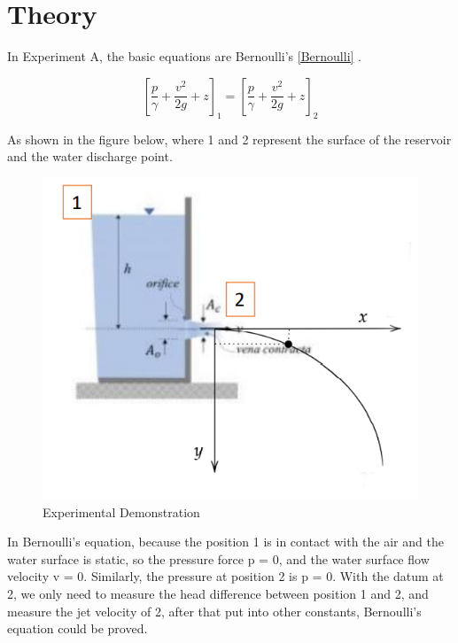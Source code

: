 \section{Theory}
In Experiment A, the basic equations are Bernoulli's \eqref{Bernoulli} .

\begin{equation}
\label{Bernoulli}
\left[ \frac{p}{\gamma}+\frac{v^2}{2g}+z \right]_1 = 
\left[ \frac{p}{\gamma}+\frac{v^2}{2g}+z \right]_2 
\end{equation}

As shown in the figure below, where 1 and 2 represent the surface of 
the reservoir and the water discharge point.

\begin{figure}[htb] %
    \centering
    \includegraphics[scale=0.45]{Theory/figures/figure1.png}
    \caption{Experimental Demonstration}
    \label{fig:intro_co2}
\end{figure}

In Bernoulli's equation, because the position 1 is in contact with the air and the water surface is static, 
so the pressure force p = 0, and the water surface flow velocity v = 0. 
Similarly, the pressure at position 2 is p = 0. 
With the datum at 2, we only need to measure the head difference between position 1 and 2, 
and measure the jet velocity of 2, after that put into other constants, 
Bernoulli's equation could be proved.










